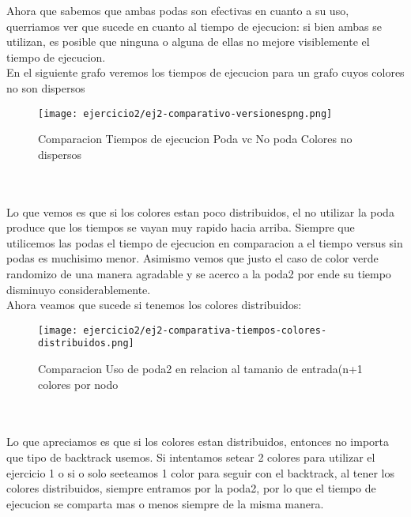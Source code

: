 \pagebreak
Ahora que sabemos que ambas podas son efectivas en cuanto a su uso, querriamos ver que sucede en cuanto al tiempo de ejecucion: si bien ambas se utilizan, es posible que ninguna o alguna de ellas no mejore visiblemente el tiempo de ejecucion.\\
En el siguiente grafo veremos los tiempos de ejecucion para un grafo cuyos colores no son dispersos

\begin{figure}[h!]
\texttt{[image: ejercicio2/ej2-comparativo-versionespng.png]}
\centering
\caption{Comparacion Tiempos de ejecucion Poda vc No poda Colores no dispersos}
\label{overflow3}
\end{figure}
\\
\\

Lo que vemos es que si los colores estan poco distribuidos, el no utilizar la poda produce que los tiempos se vayan muy rapido hacia arriba. Siempre que utilicemos las podas el tiempo de ejecucion en comparacion a el tiempo versus sin podas es muchisimo menor. Asimismo vemos que justo el caso de color verde randomizo de una manera agradable y se acerco a la poda2 por ende su tiempo disminuyo considerablemente.\\

\pagebreak
Ahora veamos que sucede si tenemos los colores distribuidos:

\begin{figure}[h!]
\texttt{[image: ejercicio2/ej2-comparativa-tiempos-colores-distribuidos.png]}
\centering
\caption{Comparacion Uso de poda2 en relacion al tamanio de entrada(n+1 colores por nodo}
\label{overflow3}
\end{figure}

\\
\\
Lo que apreciamos es que si los colores estan distribuidos, entonces no importa que tipo de backtrack usemos. Si intentamos setear 2 colores para utilizar el ejercicio 1 o si o solo seeteamos 1 color para seguir con el backtrack, al tener los colores distribuidos, siempre entramos por la poda2, por lo que el tiempo de ejecucion se comparta mas o menos siempre de la misma manera. 
\pagebreak